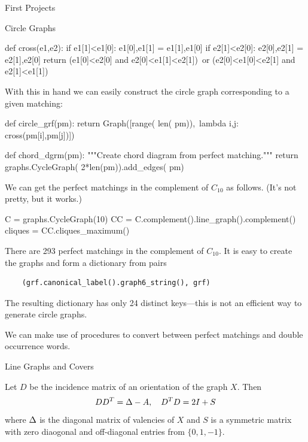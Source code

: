 \begin{chap}{First Projects}
\begin{sect}{Circle Graphs}
\begin{sageblock}
def cross(e1,e2):
    if e1[1]<e1[0]: e1[0],e1[1] = e1[1],e1[0]
    if e2[1]<e2[0]: e2[0],e2[1] = e2[1],e2[0]
    return (e1[0]<e2[0] and e2[0]<e1[1]<e2[1])\
      or (e2[0]<e1[0]<e2[1] and e2[1]<e1[1])
\end{sageblock}
%
\begin{para}
With this in hand we can easily construct the circle graph corresponding
to a given matching:
\end{para}
%
\begin{sageblock}
def circle_grf(pm):
    return Graph([range( len( pm)),\
      lambda i,j: cross(pm[i],pm[j])])
\end{sageblock}
%
\begin{sageblock}
def chord_dgrm(pm):
    """Create chord diagram from perfect matching."""
    return graphs.CycleGraph( 2*len(pm)).add_edges( pm)
\end{sageblock}
%
\begin{para}
We can get the perfect matchings in the complement of $C_{10}$ as follows.
(It's not pretty, but it works.)
\end{para}
%
\begin{sageblock}
    C = graphs.CycleGraph(10)
    CC = C.complement().line_graph().complement()
    cliques = CC.cliques_maximum()
\end{sageblock}
%
\begin{para}
There are 293 perfect matchings in the complement of $C_{10}$. It is easy
to create the graphs and form a dictionary from pairs
\end{para}
%
\begin{verbatim}
    (grf.canonical_label().graph6_string(), grf)
\end{verbatim}
%
\begin{para}
The resulting dictionary has only 24 distinct keys---this is not an efficient
way to generate circle graphs.
\end{para}
%
\begin{para}
We can make use of procedures to convert between perfect matchings and double
occurrence words.
\end{para}
%
\end{sect}
%
\begin{sect}{Line Graphs and Covers}
%
\begin{para}
Let $D$ be the incidence matrix of an orientation of the graph $X$. Then
\[
    DD^T = \Delta -A,\quad D^TD = 2I +S
\]
where $\Delta$ is the diagonal matrix of valencies of $X$ and $S$ is a symmetric
matrix with zero diaogonal and off-diagonal entries from $\{0,1,-1\}$.

\end{para}
\end{sect}
\end{chap}
